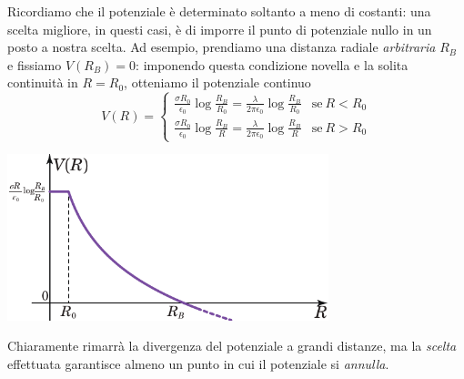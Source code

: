 Ricordiamo che il potenziale è determinato soltanto a meno di costanti: una scelta migliore, in questi casi, è di imporre il punto di potenziale nullo in un posto a nostra scelta. Ad esempio, prendiamo una distanza radiale \textit{arbitraria} $R_{B}$ e fissiamo $V(R_B)=0$: imponendo questa condizione novella e la solita continuità in $R=R_0$, otteniamo il potenziale continuo
\begin{equation}
	V(R)=
	\begin{cases}
		\frac{\sigma R_0}{\epsilon_0}\log \frac{R_B}{R_0}=\frac{\lambda}{2\pi\epsilon_0}\log \frac{R_B}{R_0}&\text{se}\ R< R_0\\
		\frac{\sigma R_0}{\epsilon_0}\log \frac{R_B}{R}=\frac{\lambda}{2\pi\epsilon_0}\log \frac{R_B}{R}&\text{se}\ R> R_0
	\end{cases}
\end{equation}
\begin{center}
	\includegraphics[width=0.7\textwidth]{images/chp3/chp3cilindrograf2.pdf}
\end{center}
Chiaramente rimarrà la divergenza del potenziale a grandi distanze, ma la \textit{scelta} effettuata garantisce almeno un punto in cui il potenziale si \textit{annulla}.
